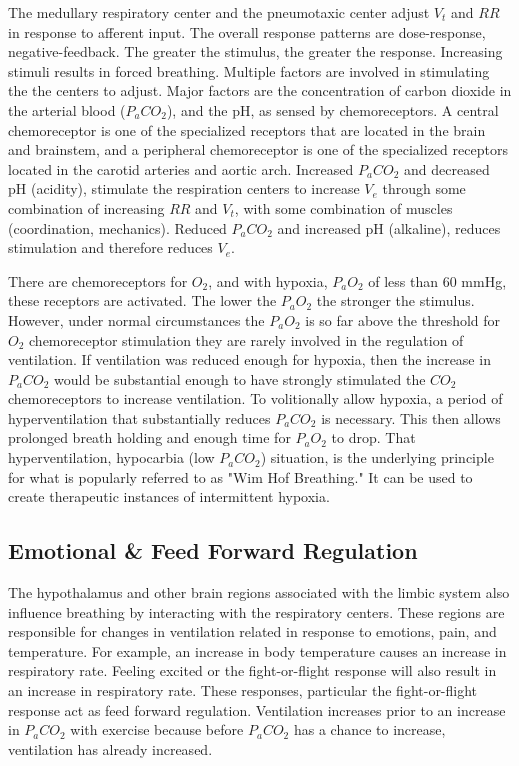 The medullary respiratory center and the pneumotaxic center adjust $V_t$ and $RR$ in response to afferent input.  The overall response patterns are dose-response, negative-feedback. The greater the stimulus, the greater the response. Increasing stimuli results in forced breathing. Multiple factors are involved in stimulating the the centers to adjust. Major factors are the concentration of carbon dioxide in the arterial blood ($P_aCO_2$), and the pH, as sensed by chemoreceptors. A central chemoreceptor is one of the specialized receptors that are located in the brain and brainstem, and a peripheral chemoreceptor is one of the specialized receptors located in the carotid arteries and aortic arch. Increased $P_aCO_2$ and decreased pH (acidity), stimulate the respiration centers to increase $V_e$ through some combination of increasing $RR$ and $V_t$, with some combination of muscles (coordination, mechanics). Reduced $P_aCO_2$ and increased pH (alkaline), reduces stimulation and therefore reduces $V_e$.

There are chemoreceptors for $O_2$, and with hypoxia, $P_aO_2$ of less than 60 mmHg, these receptors are activated. The lower the $P_aO_2$ the stronger the stimulus. However, under normal circumstances the $P_aO_2$ is so far above the threshold for $O_2$ chemoreceptor stimulation they are rarely involved in the regulation of ventilation. If ventilation was reduced enough for hypoxia, then the increase in $P_aCO_2$ would be substantial enough to have strongly stimulated the $CO_2$ chemoreceptors to increase ventilation. To volitionally allow hypoxia, a period of hyperventilation that substantially reduces $P_aCO_2$ is necessary. This then allows prolonged breath holding and enough time for $P_aO_2$ to drop. That hyperventilation, hypocarbia (low $P_aCO_2$) situation, is the underlying principle for what is popularly referred to as "Wim Hof Breathing." It can be used to create therapeutic instances of intermittent hypoxia.

\subsection{Emotional \& Feed Forward Regulation}
The hypothalamus and other brain regions associated with the limbic system also influence breathing by interacting with the respiratory centers. These regions are responsible for changes in ventilation related in response to emotions, pain, and temperature. For example, an increase in body temperature causes an increase in respiratory rate. Feeling excited or the fight-or-flight response will also result in an increase in respiratory rate. These responses, particular the fight-or-flight response act as feed forward regulation. Ventilation increases prior to an increase in $P_aCO_2$ with exercise because before $P_aCO_2$ has a chance to increase, ventilation has already increased.

